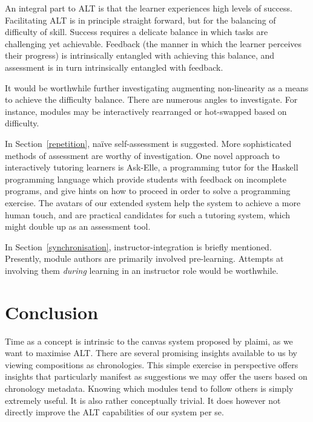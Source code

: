 \documentclass{article}
\begin{document}
\begin{multicols}{2}
An integral part to ALT is that the learner experiences high levels of 
success\cite{cotton1990educational, murphy2011games}. Facilitating ALT is in 
principle straight forward, but for the balancing of difficulty of skill. 
Success requires a delicate balance in which tasks are challenging yet 
achievable. Feedback (the manner in which the learner perceives their 
progress) is intrinsically entangled with achieving this balance, and 
assessment is in turn intrinsically entangled with 
feedback\cite{murphy2011games}.

It would be worthwhile further investigating augmenting non-linearity as a 
means to achieve the difficulty balance. There are numerous angles to 
investigate. For instance, modules may be interactively rearranged or 
hot-swapped based on difficulty.

In Section~\ref{repetition}, naïve self-assessment is suggested. More 
sophisticated methods of assessment are worthy of investigation. One novel 
approach to interactively tutoring learners is Ask-Elle, a programming tutor 
for the Haskell programming language which provide students with feedback on 
incomplete programs, and give hints on how to proceed in order to solve a 
programming exercise\cite{jeuring2012ask}. The avatars of our extended system 
help the system to achieve a more human touch\cite{berntsen2015enabling}, and 
are practical candidates for such a tutoring system, which might double up as 
an assessment tool.

In Section~\ref{synchronisation}, instructor-integration is briefly mentioned. 
Presently, module authors are primarily involved pre-learning. Attempts at 
involving them \emph{during} learning in an instructor role would be 
worthwhile.
 \section{Conclusion}
Time as a concept is intrinsic to the canvas system proposed by plaimi, as we 
want to maximise ALT. There are several promising insights available to us by 
viewing compositions as chronologies. This simple exercise in perspective 
offers insights that particularly manifest as suggestions we may offer the 
users based on chronology metadata. Knowing which modules tend to follow 
others is simply extremely useful. It is also rather conceptually trivial. It 
does however not directly improve the ALT capabilities of our system per se.


\end{multicols}
\end{document}
